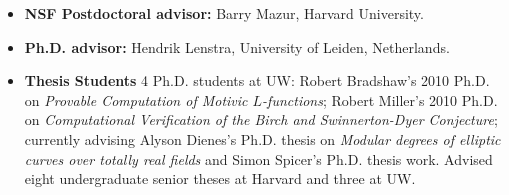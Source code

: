 \documentclass[11pt]{article}
\begin{document}
\begin{itemize}\setlength{\itemsep}{-0.5ex}
\item {\bf NSF Postdoctoral advisor:} Barry Mazur, Harvard
University.
\item {\bf Ph.D. advisor:} Hendrik Lenstra, University of Leiden,
Netherlands.%
\end{itemize}
\begin{itemize}\setlength{\itemsep}{-0.5ex}
\item \textbf{Thesis Students}  4 Ph.D. students at UW:  
Robert Bradshaw's 2010 Ph.D. on {\em Provable Computation of Motivic
$L$-functions}; Robert Miller's 2010 Ph.D. on {\em Computational Verification of
the Birch and Swinnerton-Dyer Conjecture};
currently advising Alyson Dienes's Ph.D. thesis on
{\em Modular degrees of elliptic curves over totally real fields}
and Simon Spicer's Ph.D. thesis work.
Advised eight undergraduate senior theses at
Harvard and three at UW.
\end{itemize}






\end{document}
